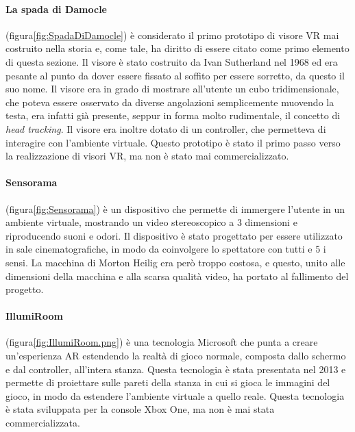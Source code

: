         \paragraph{La spada di Damocle} (figura\ref{fig:SpadaDiDamocle}) è considerato  il primo prototipo di visore VR mai costruito nella storia e, come tale, ha diritto di essere
            citato come primo elemento di questa sezione. Il visore è stato costruito da Ivan Sutherland nel 1968 ed era pesante al punto da dover essere fissato al soffito per
            essere sorretto, da questo il suo nome. Il visore era in grado di mostrare all'utente un cubo tridimensionale, che poteva essere osservato da diverse angolazioni 
            semplicemente muovendo la testa, era infatti già presente, seppur in forma molto rudimentale, il concetto di \textit{head tracking}. Il visore era inoltre dotato di un 
            controller, che permetteva di interagire con l'ambiente virtuale. Questo prototipo è stato il primo passo verso la realizzazione di visori VR, ma non è stato
            mai commercializzato.

        \paragraph{Sensorama} (figura\ref{fig:Sensorama}) è un dispositivo che permette di immergere l'utente in un
            ambiente virtuale, mostrando un video stereoscopico a 3 dimensioni e riproducendo suoni e odori. Il dispositivo è stato
            progettato per essere utilizzato in sale cinematografiche, in modo da coinvolgere lo spettatore con tutti e 5 i sensi.
            La macchina di Morton Heilig era però troppo costosa, e questo, unito alle dimensioni della macchina e alla scarsa qualità
            video, ha portato al fallimento del progetto.

        \paragraph{IllumiRoom} (figura\ref{fig:IllumiRoom.png}) è una tecnologia Microsoft che punta a creare un'esperienza AR estendendo la realtà di gioco
            normale, composta dallo schermo e dal controller, all'intera stanza. Questa tecnologia è stata presentata nel 2013
            e permette di proiettare sulle pareti della stanza in cui si gioca le immagini del gioco, in modo da estendere
            l'ambiente virtuale a quello reale. Questa tecnologia è stata sviluppata per la console Xbox One, ma non è mai
            stata commercializzata.\cite{Schmalstieg2016}
        
